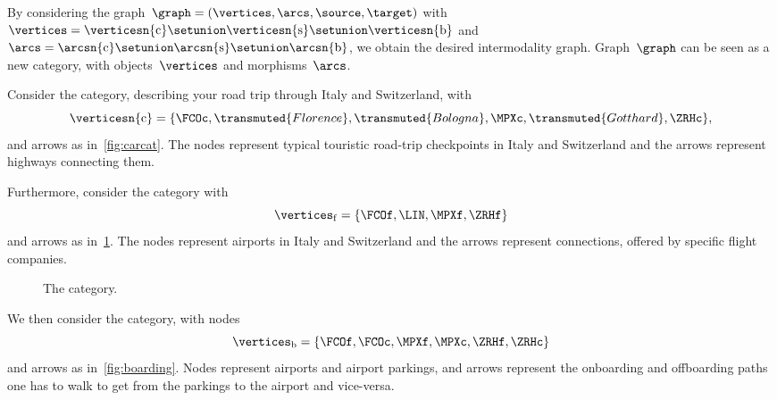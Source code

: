By considering the graph~$\graph=(\vertices,\arcs,\source,\target)$ with~$\vertices=\verticesn{\mathrm{c}}\setunion \verticesn{\mathrm{s}}\setunion \verticesn{\mathrm{b}}$ and~$\arcs=\arcsn{\mathrm{c}}\setunion \arcsn{\mathrm{s}}\setunion \arcsn{\mathrm{b}}$, we obtain the desired intermodality graph.
Graph~$\graph$ can be seen as a new category, with objects~$\vertices$ and morphisms~$\arcs$.
\begin{example}
    \label{exa:car-category}
    Consider the \Car category, describing your road trip through Italy and Switzerland, with
    \begin{equation*}
        \verticesn{\mathrm{c}}=
        \{
        \FCOc,
        \transmuted{Florence},
        \transmuted{Bologna},
        \MPXc,
        \transmuted{Gotthard},
        \ZRHc
        \},
    \end{equation*}
    and arrows as in~\cref{fig:carcat}.
    The nodes represent typical touristic road-trip checkpoints in Italy and Switzerland and the arrows represent highways connecting them.

    \begin{figure*}[h!]
        \caption{The \Car category.}
        \label{fig:carcat}
    \end{figure*}

    Furthermore, consider the \Flight category with
    \begin{equation}
        \vertices_\mathrm{f}
        = \{
        \FCOf,
        \LIN,
        \MPXf,
        \ZRHf
        \}
    \end{equation}
    and arrows as in~\cref{fig:flight}.
    The nodes represent airports in Italy and Switzerland and the arrows represent connections, offered by specific flight companies.

    \begin{figure}[h!]
        \centering
        \caption{The \Flight category.}
        \label{fig:flight}
    \end{figure}

    We then consider the \Board category, with nodes
    \begin{equation*}
        \vertices_\mathrm{b}=\{\FCOf,\FCOc,\MPXf,\MPXc,\ZRHf,\ZRHc\}
    \end{equation*}
    and arrows as in~\cref{fig:boarding}.
    Nodes represent airports and airport parkings, and arrows represent the onboarding and offboarding paths one has to walk to get from the parkings to the airport and vice-versa.


\end{example}
